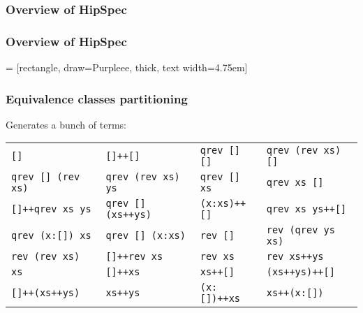 \documentclass[serif,professionalfont]{beamer}
\newcommand\dn[0]{\vspace{\baselineskip}}
\begin{document}
\begin{frame}
  \frametitle{Overview of HipSpec}
  
\end{frame}

\begin{frame}
  \frametitle{Overview of HipSpec}
  \def\hlqs{} %
  
  \undef\hlqs
\end{frame}

\newcommand\vb[1]{\mbox{{\tt #1}}}

 = [rectangle, draw=Purpleee, thick, text width=4.75em]

\begin{frame}[fragile]
\frametitle{Equivalence classes partitioning}

Generates a bunch of terms:

\dn


\begin{tabular}{>{\footnotesize}l >{\footnotesize}l >{\footnotesize}l >{\footnotesize}l}
\vb{[]}&
\vb{[]++[]}&
\vb{qrev [] []}&
\vb{qrev (rev xs) []}\\
\vb{qrev [] (rev xs)}&
\vb{qrev (rev xs) ys}&
\vb{qrev [] xs}&
\vb{qrev xs []}\\
\vb{[]++qrev xs ys}&
\vb{qrev [] (xs++ys)}&
\vb{(x:xs)++[]}&
\vb{qrev xs ys++[]}\\
\vb{qrev (x:[]) xs}&
\vb{qrev [] (x:xs)}&
\vb{rev []}&
\vb{rev (qrev ys xs)}\\
\vb{rev (rev xs)}&
\vb{[]++rev xs}&
\vb{rev xs}&
\vb{rev xs++ys}\\
\vb{xs}&
\vb{[]++xs}&
\vb{xs++[]}&
\vb{(xs++ys)++[]}\\
\vb{[]++(xs++ys)}&
\vb{xs++ys}&
\vb{(x:[])++xs}&
\vb{xs++(x:[])}
\end{tabular}

\end{frame}
\end{document}
